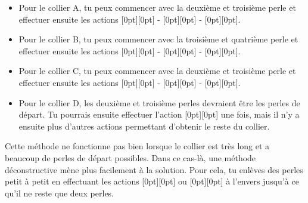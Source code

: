 \documentclass[a4paper,11pt]{report}
\newcommand{\taskGraphicsFolder}{..}
\begin{document}
\begin{itemize}
  \item Pour le collier A, tu peux commencer avec la deuxième et troisième perle et effectuer ensuite les actions \raisebox{-0.5ex}[0pt][0pt]{} - \raisebox{-0.5ex}[0pt][0pt]{} - \raisebox{-0.5ex}[0pt][0pt]{}.
  \item Pour le collier B, tu peux commencer avec la troisième et quatrième perle et effectuer ensuite les actions \raisebox{-0.5ex}[0pt][0pt]{} - \raisebox{-0.5ex}[0pt][0pt]{} - \raisebox{-0.5ex}[0pt][0pt]{}.
  \item Pour le collier C, tu peux commencer avec la deuxième et troisième perle et effectuer ensuite les actions \raisebox{-0.5ex}[0pt][0pt]{} - \raisebox{-0.5ex}[0pt][0pt]{} - \raisebox{-0.5ex}[0pt][0pt]{}.
  \item Pour le collier D, les deuxième et troisième perles devraient être les perles de départ. Tu pourrais ensuite effectuer l’action \raisebox{-0.5ex}[0pt][0pt]{} une fois, mais il n’y a ensuite plus d’autres actions permettant d’obtenir le reste du collier.
\end{itemize}

Cette méthode ne fonctionne pas bien lorsque le collier est très long et a beaucoup de perles de départ possibles. Dans ce cas-là, une méthode déconstructive mène plus facilement à la solution. Pour cela, tu enlèves des perles petit à petit en effectuant les actions \raisebox{-0.5ex}[0pt][0pt]{} ou \raisebox{-0.5ex}[0pt][0pt]{} à l’envers jusqu’à ce qu’il ne reste que deux perles.
\end{document}
